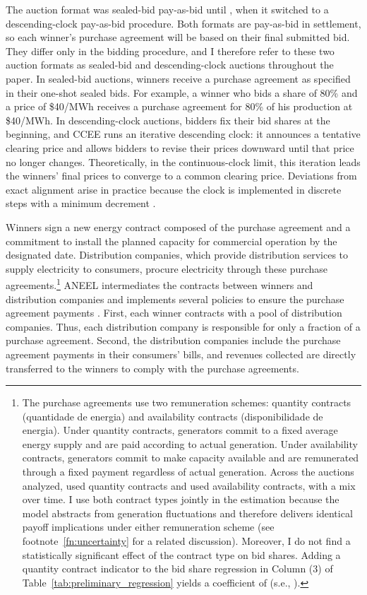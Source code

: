 \documentclass[12pt]{article}
\theoremstyle{definition} %
\begin{document}
The auction format was sealed-bid pay-as-bid until , when it switched to a descending-clock pay-as-bid procedure. Both formats are pay-as-bid in settlement, so each winner's purchase agreement will be based on their final submitted bid. They differ only in the bidding procedure, and I therefore refer to these two auction formats as sealed-bid and descending-clock auctions throughout the paper. In sealed-bid auctions, winners receive a purchase agreement as specified in their one-shot sealed bids. For example, a winner who bids a share of 80\% and a price of \$40/MWh receives a purchase agreement for 80\% of his production at \$40/MWh. In descending-clock auctions, bidders fix their bid shares at the beginning, and CCEE runs an iterative descending clock: it announces a tentative clearing price and allows bidders to revise their prices downward until that price no longer changes. Theoretically, in the continuous-clock limit, this iteration leads the winners' final prices to converge to a common clearing price. Deviations from exact alignment arise in practice because the clock is implemented in discrete steps with a minimum decrement \citep{Hochberg2018}.

Winners sign a new energy contract composed of the purchase agreement and a commitment to install the planned capacity for commercial operation by the designated date. Distribution companies, which provide distribution services to supply electricity to consumers, procure electricity through these purchase agreements.\footnote{
The purchase agreements use two remuneration schemes: quantity contracts (quantidade de energia) and availability contracts (disponibilidade de energia). Under quantity contracts, generators commit to a fixed average energy supply and are paid according to actual generation. Under availability contracts, generators commit to make capacity available and are remunerated through a fixed payment regardless of actual generation. Across the  auctions analyzed,  used quantity contracts and  used availability contracts, with a mix over time. I use both contract types jointly in the estimation because the model abstracts from generation fluctuations and therefore delivers identical payoff implications under either remuneration scheme (see footnote~\ref{fn:uncertainty} for a related discussion). Moreover, I do not find a statistically significant effect of the contract type on bid shares. Adding a quantity contract indicator to the bid share regression in Column (3) of Table~\ref{tab:preliminary_regression} yields a coefficient of  (s.e., ).
}
ANEEL intermediates the contracts between winners and distribution companies and implements several policies to ensure the purchase agreement payments \citep{Tolmasquim2021}. First, each winner contracts with a pool of distribution companies. Thus, each distribution company is responsible for only a fraction of a purchase agreement. Second, the distribution companies include the purchase agreement payments in their consumers' bills, and revenues collected are directly transferred to the winners to comply with the purchase agreements.
\end{document}
